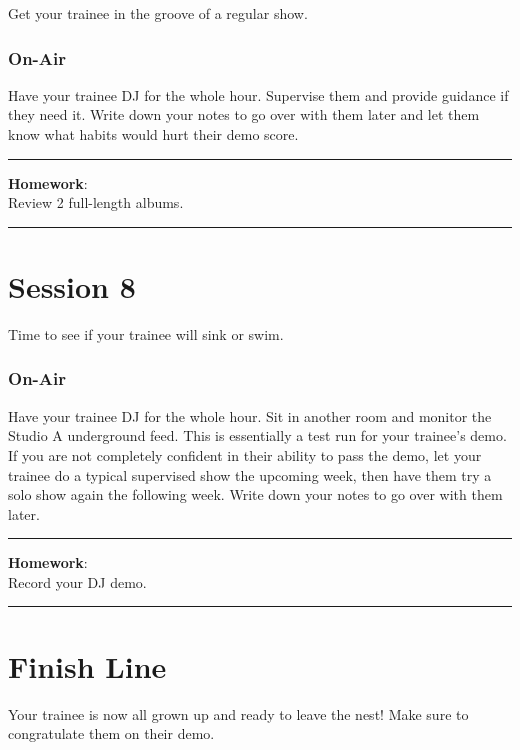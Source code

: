 \documentclass[]{witrman}
\newcommand{\makehomework}[1]{%
\vspace{1mm}
\rule{\textwidth}{1pt}
\textbf{Homework}:\\
#1\\
\rule[2mm]{\textwidth}{1pt}
}
\begin{document}
Get your trainee in the groove of a regular show.

\subsection{On-Air}

Have your trainee DJ for the whole hour.  Supervise them and provide guidance if
they need it.  Write down your notes to go over with them later and let them
know what habits would hurt their demo score.

\makehomework{Review 2 full-length albums.}


\chapter{Session 8}

Time to see if your trainee will sink or swim.

\subsection{On-Air}

Have your trainee DJ for the whole hour.  Sit in another room and monitor the
Studio A underground feed.  This is essentially a test run for your trainee's
demo.  If you are not completely confident in their ability to pass the demo,
let your trainee do a typical supervised show the upcoming week, then have them
try a solo show again the following week.  Write down your notes to go over with
them later.

\makehomework{Record your DJ demo.}


\chapter{Finish Line}

Your trainee is now all grown up and ready to leave the nest!  Make sure to
congratulate them on their demo.

\makefooter{}
\end{document}
